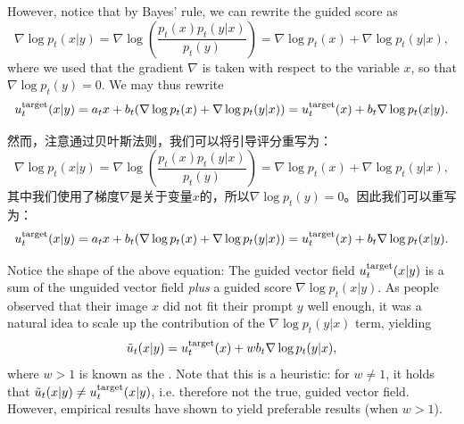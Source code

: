 However, notice that by Bayes' rule, we can rewrite the guided score as
\begin{equation}
   \nabla \log p_t(x|y) = \nabla \log \left(\frac{p_t(x)p_t(y|x)}{p_t(y)}\right) = \nabla \log p_t(x) + \nabla \log p_t(y|x), 
   \label{eq:bayes_rule}
\end{equation}
where we used that the gradient $\nabla$ is taken with respect to the variable $x$, so that $\nabla \log p_t(y) = 0$. We may thus rewrite 
\begin{align*}
    u^{\text{target}}_t(x|y) = a_tx + b_t(\nabla \log p_t(x) + \nabla \log p_t(y|x)) = u^{\text{target}}_t(x) + b_t \nabla \log p_t(x|y).
\end{align*}

然而，注意通过贝叶斯法则，我们可以将引导评分重写为：
\begin{equation}
   \nabla \log p_t(x|y) = \nabla \log \left(\frac{p_t(x)p_t(y|x)}{p_t(y)}\right) = \nabla \log p_t(x) + \nabla \log p_t(y|x), 
   \label{eq:bayes_rule}
\end{equation}
其中我们使用了梯度$\nabla$是关于变量$x$的，所以$\nabla \log p_t(y) = 0$。因此我们可以重写为：
\begin{align*}
    u^{\text{target}}_t(x|y) = a_tx + b_t(\nabla \log p_t(x) + \nabla \log p_t(y|x)) = u^{\text{target}}_t(x) + b_t \nabla \log p_t(x|y).
\end{align*}

Notice the shape of the above equation: The guided vector field $u^{\text{target}}_t(x|y)$ is a sum of the unguided vector field \emph{plus} a guided score $\nabla\log p_t(x|y)$. As people observed that their image $x$ did not fit their prompt $y$ well enough, it was a natural idea to scale up the contribution of the $\nabla \log p_t(y|x)$ term, yielding
\begin{align*}
    \tilde{u}_t(x|y) = u^{\text{target}}_t(x) + w b_t \nabla \log p_t(y|x),
\end{align*}
where $w > 1$ is known as the . Note that this is a heuristic: for $w \neq 1$, it holds that $\tilde{u}_t(x|y) \neq u^{\text{target}}_t(x|y)$, i.e. therefore not the true, guided vector field. However, empirical results have shown to yield preferable results (when $w > 1$).

